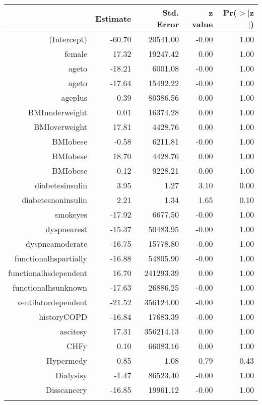 \bigskip\bigskip
\centering
\begin{tabular}{rrrrr}
  \hline
 & Estimate & Std. Error & z value & Pr($>$$|$z$|$) \\ 
  \hline
(Intercept) & -60.70 & 20541.00 & -0.00 & 1.00 \\ 
  female & 17.32 & 19247.42 & 0.00 & 1.00 \\ 
  age\-65\-to\-74 & -18.21 & 6001.08 & -0.00 & 1.00 \\ 
  age\-75\-to\-84 & -17.64 & 15492.22 & -0.00 & 1.00 \\ 
  age\-85\-plus & -0.39 & 80386.56 & -0.00 & 1.00 \\ 
  BMI\-underweight & 0.01 & 16374.28 & 0.00 & 1.00 \\ 
  BMI\-overweight & 17.81 & 4428.76 & 0.00 & 1.00 \\ 
  BMI\-obese\-1 & -0.58 & 6211.81 & -0.00 & 1.00 \\ 
  BMI\-obese\-2 & 18.70 & 4428.76 & 0.00 & 1.00 \\ 
  BMI\-obese\-3 & -0.12 & 9228.21 & -0.00 & 1.00 \\ 
  diabetes\-insulin & 3.95 & 1.27 & 3.10 & 0.00 \\ 
  diabetes\-noninsulin & 2.21 & 1.34 & 1.65 & 0.10 \\ 
  smoke\-yes & -17.92 & 6677.50 & -0.00 & 1.00 \\ 
  dyspnea\-rest & -15.37 & 50483.95 & -0.00 & 1.00 \\ 
  dyspnea\-moderate & -16.75 & 15778.80 & -0.00 & 1.00 \\ 
  functional\-hs\-partially & -16.88 & 54805.90 & -0.00 & 1.00 \\ 
  functional\-hs\-dependent & 16.70 & 241293.39 & 0.00 & 1.00 \\ 
  functional\-hs\-unknown & -17.63 & 26886.25 & -0.00 & 1.00 \\ 
  ventilator\-dependent & -21.52 & 356124.00 & -0.00 & 1.00 \\ 
  history\-COPD & -16.84 & 17683.39 & -0.00 & 1.00 \\ 
  ascites\-y & 17.31 & 356214.13 & 0.00 & 1.00 \\ 
  CHF\-y & 0.10 & 66083.16 & 0.00 & 1.00 \\ 
  Hyper\-med\-y & 0.85 & 1.08 & 0.79 & 0.43 \\ 
  Dialysis\-y & -1.47 & 86523.40 & -0.00 & 1.00 \\ 
  Diss\-cancer\-y & -16.85 & 19961.12 & -0.00 & 1.00 \\ 
$$
\end{tabular}
